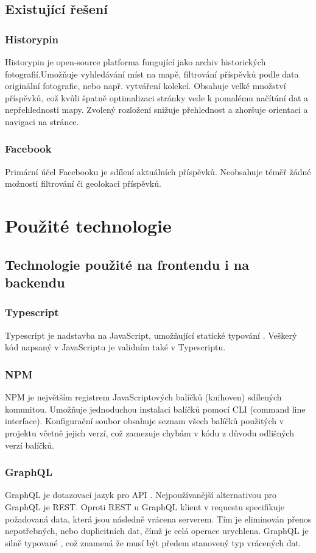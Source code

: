 \documentclass[12pt, a4paper,
 twoside,        %
 openright
]{report}
\begin{document}
\section{Existující řešení}
\subsection{Historypin}
Historypin je open-source platforma fungující jako archiv historických fotografií.Umožňuje vyhledávání míst na mapě, filtrování příspěvků podle data originální fotografie, nebo např. vytváření kolekcí. Obsahuje velké množství příspěvků, což kvůli špatně optimalizaci stránky vede k pomalému načítání dat a nepřehlednosti mapy. Zvolený rozložení snižuje přehlednost a zhoršuje orientaci a navigaci na stránce.
\subsection{Facebook}
Primární účel Facebooku je sdílení aktuálních příspěvků. Neobsahuje téměř žádné možnosti filtrování či geolokaci příspěvků.

\chapter{Použité technologie}
\section{Technologie použité na frontendu i na backendu}
\subsection{Typescript}
Typescript je nadstavba na JavaScript, umožňující statické typování \cite{DynamicVsStaticTyping}. Veškerý kód napsaný v JavaScriptu je validním také v Typescriptu. \cite{whatIsTypescript}\cite{typescriptForTheNewProgrammer}
\subsection{NPM}
NPM je největším registrem JavaScriptových balíčků (knihoven) sdílených komunitou. Umožňuje jednoduchou instalaci balíčků pomocí CLI (command line interface). Konfigurační soubor obsahuje seznam všech balíčků použitých v projektu včetně jejich verzí, což zamezuje chybám v kódu z důvodu odlišných verzí balíčků. \cite{whatIsNpmW3}\cite{aboutNpm}

\subsection{GraphQL}
GraphQL je dotazovací jazyk pro API \cite{graphqlIntroduction}. Nejpoužívanější alternativou pro GraphQL je REST. Oproti REST u GraphQL klient v requestu specifikuje požadovaná data, která jsou následně vrácena serverem. Tím je eliminován přenos nepotřebných, nebo duplicitních dat, čímž je celá operace urychlena. GraphQL je silně typované \cite{graphqlTypes}, což znamená že musí být předem stanovený typ vrácených dat. \cite{restApiRedHat}\cite{whatIsApiAws}
\end{document}
